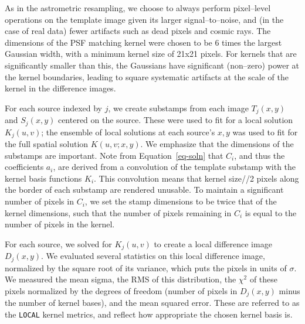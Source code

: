 \documentclass[floatfix, apj]{emulateapj}
\begin{document}
As in the astrometric resampling, we choose to always perform pixel--level operations on the template image given its larger signal--to--noise, and (in the case of real data) fewer artifacts such as dead pixels and cosmic rays.
The dimensions of the PSF matching kernel were chosen to be 6 times the largest Gaussian width, with a minimum kernel size of 21x21 pixels.
For kernels that are significantly smaller than this, the Gaussians have significant (non--zero) power at the kernel boundaries, leading to square systematic artifacts at the scale of the kernel in the difference images.

For each source indexed by $j$, we create substamps from each image $T_j(x,y)$ and $S_j(x,y)$ centered on the source.
These were used to fit for a local solution $K_j(u,v)$; the ensemble of local solutions at each source's $x,y$ was used to fit for the full spatial solution $K(u,v;x,y)$.
We emphasize that the dimensions of the substamps are important.
Note from Equation~\ref{eq-soln} that $C_i$, and thus the coefficients $a_i$, are derived from a convolution of the template substamp with the kernel basis functions $K_i$.
This convolution means that kernel size//2 pixels along the border of each substamp are rendered unusable.
To maintain a significant number of pixels in $C_i$, we set the stamp dimensions to be twice that of the kernel dimensions, such that the number of pixels remaining in $C_i$ is equal to the number of pixels in the kernel.

For each source, we solved for $K_j(u,v)$ to create a local difference image $D_j(x,y)$.
We evaluated several statistics on this local difference image, normalized by the square root of its variance, which puts the pixels in units of $\sigma$.
We measured the mean sigma, the RMS of this distribution, the $\chi^2$ of these pixels normalized by the degrees of freedom (number of pixels in $D_j(x,y)$ minus the number of kernel bases), and the mean squared error.
These are referred to as the {\tt LOCAL} kernel metrics, and reflect how appropriate the chosen kernel basis is.
\end{document}
